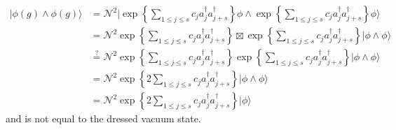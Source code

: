 \documentclass[aps, preprint]{revtex4}
\begin{document}
\begin{align}\vert \phi  \left (g\right ) \wedge \phi  \left (g\right ) \rangle  &  =\mathcal{N}^{2}\vert \exp  \left \{\sum _{1 \leq j \leq s}c_{j} a_{j}^{ \dag } a_{j +s}^{ \dag }\right \} \phi  \wedge \exp  \left \{\sum _{1 \leq j \leq s}c_{j} a_{j}^{ \dag } a_{j +s}^{ \dag }\right \} \phi  \rangle  \\
 &  =\mathcal{N}^{2} \exp  \left \{\sum _{1 \leq j \leq s}c_{j} a_{j}^{ \dag } a_{j +s}^{ \dag }\right \} \boxtimes \exp  \left \{\sum _{1 \leq j \leq s}c_{j} a_{j}^{ \dag } a_{j +s}^{ \dag }\right \}\vert \phi  \wedge \phi  \rangle  \\
 & \overset{\text{?}}{ =}\mathcal{N}^{2} \exp  \left \{\sum _{1 \leq j \leq s}c_{j} a_{j}^{ \dag } a_{j +s}^{ \dag }\right \} \exp  \left \{\sum _{1 \leq j \leq s}c_{j} a_{j}^{ \dag } a_{j +s}^{ \dag }\right \}\vert \phi  \wedge \phi  \rangle  \\
 &  =\mathcal{N}^{2} \exp  \left \{2 \sum _{1 \leq j \leq s}c_{j} a_{j}^{ \dag } a_{j +s}^{ \dag }\right \}\vert \phi  \wedge \phi  \rangle  \\
 &  =\mathcal{N}^{2} \exp  \left \{2 \sum _{1 \leq j \leq s}c_{j} a_{j}^{ \dag } a_{j +s}^{ \dag }\right \}\vert \phi  \rangle \end{align}and is not equal to the dressed vacuum state. 
\end{document}
